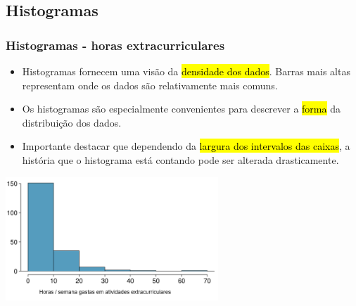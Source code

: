 
\subsection{Histogramas}


\begin{frame}[fragile]
\frametitle{Histogramas - horas extracurriculares}

\begin{itemize}
\justifying
\item Histogramas fornecem uma visão da \hl{densidade dos dados}. Barras mais altas representam onde os dados são relativamente mais comuns.
\justifying
\item Os histogramas são especialmente convenientes para descrever a \hl{forma} da distribuição dos dados.
\justifying
\item Importante destacar que dependendo da \hl{largura dos intervalos das caixas}, a história que o histograma está contando pode ser alterada drasticamente.

\end{itemize}

\begin{center}
\includegraphics[width=0.60\textwidth]{1-6_numerical_data/extracurr_hrs_hist.png}
\end{center}

\end{frame}


